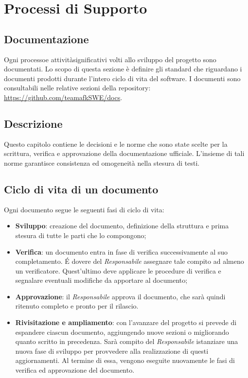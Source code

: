 \section{Processi di Supporto}
\subsection{Documentazione}
Ogni processo\glo e attività\glo significativi volti allo sviluppo del progetto sono documentati. Lo scopo di questa sezione è definire gli standard che riguardano i documenti prodotti durante l'intero ciclo di vita del software. I documenti sono consultabili nelle relative sezioni della repository\glo: \url{https://github.com/teamafkSWE/docs}. 		

\subsection{Descrizione}
Questo capitolo contiene le decisioni e le norme che sono state scelte per la scrittura, verifica e approvazione della documentazione ufficiale. L'insieme di tali norme garantisce consistenza ed omogeneità nella stesura di testi.

\subsection{Ciclo di vita di un documento}
Ogni documento segue le seguenti fasi di ciclo di vita:
\begin{itemize}
\item \textbf{Sviluppo}: creazione del documento, definizione della struttura e prima stesura di tutte le parti che lo compongono;
\item \textbf{Verifica}: un documento entra in fase di verifica successivamente al suo completamento. \'E dovere del \textit{Responsabile} assegnare tale compito ad almeno un verificatore. Quest'ultimo deve applicare le procedure di verifica e segnalare eventuali modifiche da apportare al documento;
\item \textbf{Approvazione}: il \textit{Responsabile} approva il documento, che sarà quindi ritenuto completo e pronto per il rilascio.
\item \textbf{Rivisitazione e ampliamento}: con l'avanzare del progetto si prevede di espandere ciascun documento, aggiungendo nuove sezioni o migliorando quanto scritto in precedenza. Sarà compito del \textit{Responsabile} istanziare una nuova fase di sviluppo per provvedere alla realizzazione di questi aggiornamenti. Al termine di essa, vengono eseguite nuovamente le fasi di verifica ed approvazione del documento.
\end{itemize}

